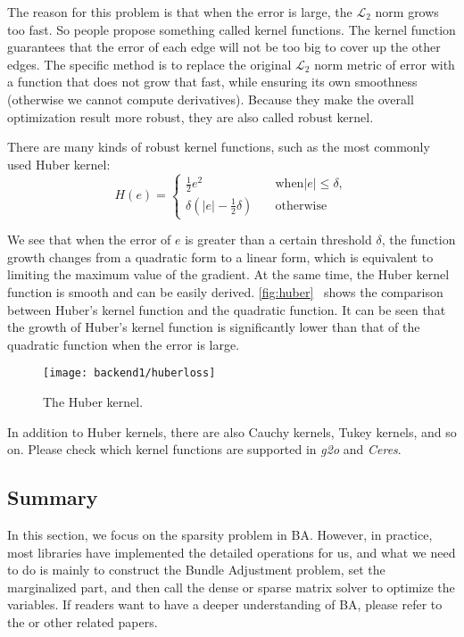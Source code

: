 The reason for this problem is that when the error is large, the $\mathcal{L}_2$ norm grows too fast. So people propose something called kernel functions. The kernel function guarantees that the error of each edge will not be too big to cover up the other edges. The specific method is to replace the original  $\mathcal{L}_2$ norm metric of error with a function that does not grow that fast, while ensuring its own smoothness (otherwise we cannot compute derivatives). Because they make the overall optimization result more robust, they are also called robust kernel.

There are many kinds of robust kernel functions, such as the most commonly used Huber kernel:
\begin{equation}
	H\left( e \right) = 
	\left\{ 
	\begin{array}{ll}
		\frac{1}{2}{e^2} &\quad \text{when} |e| \leqslant \delta, \\
		\delta \left( {\left| e \right| - \frac{1}{2}\delta } \right) &\quad \text{otherwise}
	\end{array} \right.
\end{equation}

We see that when the error of $e$ is greater than a certain threshold $\delta$, the function growth changes from a quadratic form to a linear form, which is equivalent to limiting the maximum value of the gradient. At the same time, the Huber kernel function is smooth and can be easily derived. \autoref{fig:huber}~ shows the comparison between Huber's kernel function and the quadratic function. It can be seen that the growth of Huber's kernel function is significantly lower than that of the quadratic function when the error is large.

\begin{figure}[!htp]
	\centering
	\texttt{[image: backend1/huberloss]}
	\caption{The Huber kernel.}
	\label{fig:huber}
\end{figure}

In addition to Huber kernels, there are also Cauchy kernels, Tukey kernels, and so on. Please check which kernel functions are supported in \textit{g2o} and \textit{Ceres}.

\subsection{Summary}
In this section, we focus on the sparsity problem in BA. However, in practice, most libraries have implemented the detailed operations for us, and what we need to do is mainly to construct the Bundle Adjustment problem, set the marginalized part, and then call the dense or sparse matrix solver to optimize the variables. If readers want to have a deeper understanding of BA, please refer to the \cite{Triggs2000} or other related papers. 

